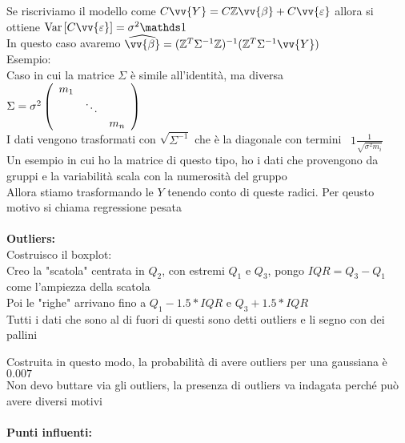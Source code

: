 Se riscriviamo il modello come $C\vv{Y} = C\ZZ\vv{\beta}+ C\vv{\eps}$ allora si ottiene $\var{C\vv{\eps}}=\sigma^2\II$\\
In questo caso avaremo $\hat{\vv{\beta}}= (\ZZ^T\Sigma^{-1}\ZZ)^{-1}(\ZZ^T\Sigma^{-1}\vv{Y})$\\

Esempio:\\
Caso in cui la matrice $\Sigma$ è simile all'identità, ma diversa \ $\Sigma = \sigma^2 \left(\begin{array}{ccc}
    m_1 & &  \\
     & \ddots & \\
     & & m_n
\end{array}\right)$\\
I dati vengono trasformati con $\sqrt{\Sigma^{-1}}$ che è la diagonale con termini \ $1\frac{1}{\sqrt{\sigma^2 m_i}}$\\
Un esempio in cui ho la matrice di questo tipo, ho i dati che provengono da gruppi e la variabilità scala con la numerosità del gruppo\\
Allora stiamo trasformando le $Y$ tenendo conto di queste radici. Per qeusto motivo si chiama regressione pesata\\ \\



\textbf{Outliers:}\\

Costruisco il boxplot:\\
Creo la "scatola" centrata in $Q_2$, con estremi $Q_1$ e $Q_3$, pongo $IQR=Q_3-Q_1$ come l'ampiezza della scatola\\
Poi le "righe" arrivano fino a $Q_1- 1.5*IQR$ e $Q_3+1.5*IQR$\\ 
Tutti i dati che sono al di fuori di questi sono detti outliers e li segno con dei pallini





Costruita in questo modo, la probabilità di avere outliers per una gaussiana è $0.007$\\

Non devo buttare via gli outliers, la presenza di outliers va indagata perché può avere diversi motivi\\ \\



\textbf{Punti influenti:}\\

